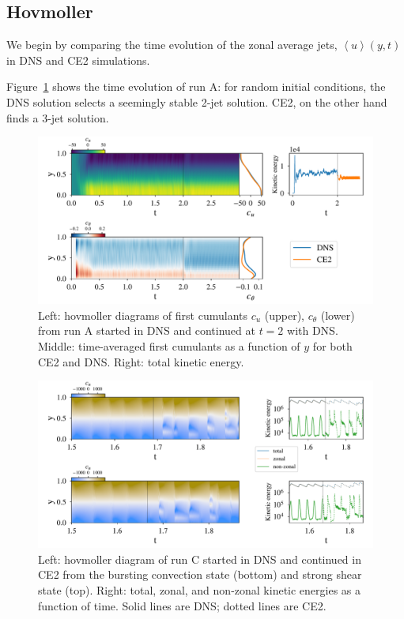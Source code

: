 \documentclass{jfm}
\begin{document}
\subsection{Hovmoller}
\label{sec:hov}

We begin by comparing the time evolution of the zonal average jets, $\left< u \right>(y, t)$ in DNS and CE2 simulations.

Figure~\ref{fig:run_A} shows the time evolution of run A: for random initial conditions, the DNS solution selects a seemingly stable 2-jet solution.
CE2, on the other hand finds a 3-jet solution.
\begin{figure}
  \centering
  \includegraphics[width=\textwidth]{../../figs/run_A_fig.pdf}
  \caption{Left: hovmoller diagrams of first cumulants $c_u$ (upper), $c_\theta$ (lower) from run A started in DNS and continued at $t=2$ with DNS. Middle: time-averaged first cumulants as a function of $y$ for both CE2 and DNS. Right: total kinetic energy.}
  \label{fig:run_A}
\end{figure}

\begin{figure}
  \centering
  \includegraphics[width=\textwidth]{../../figs/run_C_fig.pdf}
  \caption{Left: hovmoller diagram of run C started in DNS and continued in CE2 from the bursting convection state (bottom) and strong shear state (top). Right: total, zonal, and non-zonal kinetic energies as a function of time. Solid lines are DNS; dotted lines are CE2.}
  \label{fig:run_C}
\end{figure}
\end{document}
